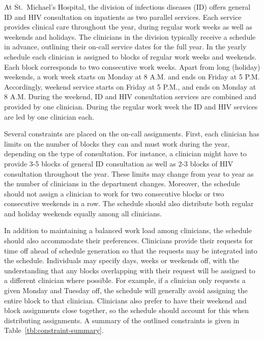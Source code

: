 At St.\ Michael's Hospital, the division of infectious diseases (ID) offers
general ID and HIV consultation on inpatients as two parallel services. Each
service provides clinical care throughout the year, during regular work weeks as
well as weekends and holidays. The clinicians in the division typically receive
a schedule in advance, outlining their on-call service dates for the full year.
In the yearly schedule each clinician is assigned to blocks of regular work
weeks and weekends. Each block corresponds to two consecutive work weeks. Apart
from long (holiday) weekends, a work week starts on Monday at 8 A.M. and ends on
Friday at 5 P.M. Accordingly, weekend service starts on Friday at 5 P.M., and
ends on Monday at 8 A.M. During the weekend, ID and HIV consultation services
are combined and provided by one clinician. During the regular work week the ID
and HIV services are led by one clinician each.

Several constraints are placed on the on-call assignments. First, each clinician
has limits on the number of blocks they can and must work during the year,
depending on the type of consultation. For instance, a clinician might have to
provide 3-5 blocks of general ID consultation as well as 2-3 blocks of HIV
consultation throughout the year. These limits may change from year to year as
the number of clinicians in the department changes. Moreover, the schedule
should not assign a clinician to work for two consecutive blocks or two
consecutive weekends in a row. The schedule should also distribute both regular
and holiday weekends equally among all clinicians.

In addition to maintaining a balanced work load among clinicians, the schedule
should also accommodate their preferences. Clinicians provide their requests for
time off ahead of schedule generation so that the requests may be integrated
into the schedule. Individuals may specify days, weeks or weekends off, with the
understanding that any blocks overlapping with their request will be assigned to
a different clinician where possible. For example, if a clinician only requests
a given Monday and Tuesday off, the schedule will generally avoid assigning the
entire block to that clinician. Clinicians also prefer to have their weekend and
block assignments close together, so the schedule should account for this when
distributing assignments. A summary of the outlined constraints is given in
Table~\ref{tbl:constraint-summary}.

